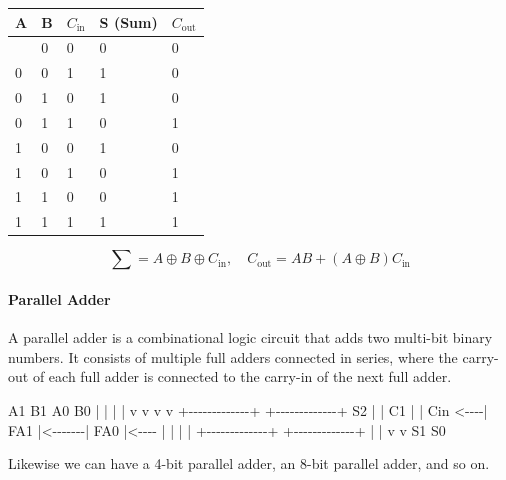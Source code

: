 \documentclass[
  a4paper,
]{article}
\newenvironment{Shaded}{}{}
\newcommand{\NormalTok}[1]{#1}
\begin{document}
\begin{longtable}[]{@{}lllll@{}}
\toprule\noalign{}
A & B & \(C_{\text{in}}\) & S (Sum) & \(C_{\text{out}}\) \\
\midrule\noalign{}
\endhead
\bottomrule\noalign{}
\endlastfoot
0 & 0 & 0 & 0 & 0 \\
0 & 0 & 1 & 1 & 0 \\
0 & 1 & 0 & 1 & 0 \\
0 & 1 & 1 & 0 & 1 \\
1 & 0 & 0 & 1 & 0 \\
1 & 0 & 1 & 0 & 1 \\
1 & 1 & 0 & 0 & 1 \\
1 & 1 & 1 & 1 & 1 \\
\end{longtable}

\[ \sum = A \oplus B \oplus C_{\text{in}} , \quad C_{\text{out}} = AB + (A \oplus B)C_{\text{in}} \]

\paragraph{Parallel Adder}\label{parallel-adder}

A parallel adder is a combinational logic circuit that adds two
multi-bit binary numbers. It consists of multiple full adders connected
in series, where the carry-out of each full adder is connected to the
carry-in of the next full adder.

\begin{Shaded}
\begin{Highlighting}[]
\NormalTok{        A1      B1             A0      B0}
\NormalTok{        |       |              |       |}
\NormalTok{        v       v              v       v}
\NormalTok{     +{-}{-}{-}{-}{-}{-}{-}{-}{-}{-}{-}{-}{-}+        +{-}{-}{-}{-}{-}{-}{-}{-}{-}{-}{-}{-}{-}+}
\NormalTok{S2   |             |   C1   |             | Cin}
\NormalTok{\textless{}{-}{-}{-}{-}|     FA1     |\textless{}{-}{-}{-}{-}{-}{-}{-}|     FA0     |\textless{}{-}{-}{-}{-}}
\NormalTok{     |             |        |             |}
\NormalTok{     +{-}{-}{-}{-}{-}{-}{-}{-}{-}{-}{-}{-}{-}+        +{-}{-}{-}{-}{-}{-}{-}{-}{-}{-}{-}{-}{-}+}
\NormalTok{            |                      |}
\NormalTok{            v                      v}
\NormalTok{            S1                     S0}
\end{Highlighting}
\end{Shaded}

Likewise we can have a 4-bit parallel adder, an 8-bit parallel adder,
and so on.
\end{document}
